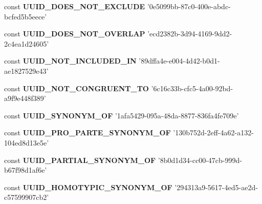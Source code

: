\begin{DoxyCompactItemize}
\item 
\hypertarget{uuids_8php_a5f3d242ba89004c96bb9a40ef73365de}{const {\bfseries U\-U\-I\-D\-\_\-\-D\-O\-E\-S\-\_\-\-N\-O\-T\-\_\-\-E\-X\-C\-L\-U\-D\-E} '0e5099bb-\/87c0-\/400e-\/abdc-\/bcfed5b5eece'}\label{uuids_8php_a5f3d242ba89004c96bb9a40ef73365de}

\item 
\hypertarget{uuids_8php_ae33e6c5b2d2ecb226e87b4058bbadbe6}{const {\bfseries U\-U\-I\-D\-\_\-\-D\-O\-E\-S\-\_\-\-N\-O\-T\-\_\-\-O\-V\-E\-R\-L\-A\-P} 'ecd2382b-\/3d94-\/4169-\/9dd2-\/2c4ea1d24605'}\label{uuids_8php_ae33e6c5b2d2ecb226e87b4058bbadbe6}

\item 
\hypertarget{uuids_8php_acbd4546a55e17960d98ae5435f4b151b}{const {\bfseries U\-U\-I\-D\-\_\-\-N\-O\-T\-\_\-\-I\-N\-C\-L\-U\-D\-E\-D\-\_\-\-I\-N} '89dffa4e-\/e004-\/4d42-\/b0d1-\/ae1827529e43'}\label{uuids_8php_acbd4546a55e17960d98ae5435f4b151b}

\item 
\hypertarget{uuids_8php_a677917e6555fb38572a85c72179e3e1f}{const {\bfseries U\-U\-I\-D\-\_\-\-N\-O\-T\-\_\-\-C\-O\-N\-G\-R\-U\-E\-N\-T\-\_\-\-T\-O} '6c16c33b-\/cfc5-\/4a00-\/92bd-\/a9f9e448f389'}\label{uuids_8php_a677917e6555fb38572a85c72179e3e1f}

\item 
\hypertarget{uuids_8php_a20dbe2288d3045cde6d7b402eb7f250a}{const {\bfseries U\-U\-I\-D\-\_\-\-S\-Y\-N\-O\-N\-Y\-M\-\_\-\-O\-F} '1afa5429-\/095a-\/48da-\/8877-\/836fa4fe709e'}\label{uuids_8php_a20dbe2288d3045cde6d7b402eb7f250a}

\item 
\hypertarget{uuids_8php_a62bdb95ccd548cc79f7d2b5dff510691}{const {\bfseries U\-U\-I\-D\-\_\-\-P\-R\-O\-\_\-\-P\-A\-R\-T\-E\-\_\-\-S\-Y\-N\-O\-N\-Y\-M\-\_\-\-O\-F} '130b752d-\/2eff-\/4a62-\/a132-\/104ed8d13e5e'}\label{uuids_8php_a62bdb95ccd548cc79f7d2b5dff510691}

\item 
\hypertarget{uuids_8php_a95094825ce6121fbe43cb5d039af5b31}{const {\bfseries U\-U\-I\-D\-\_\-\-P\-A\-R\-T\-I\-A\-L\-\_\-\-S\-Y\-N\-O\-N\-Y\-M\-\_\-\-O\-F} '8b0d1d34-\/cc00-\/47cb-\/999d-\/b67f98d1af6e'}\label{uuids_8php_a95094825ce6121fbe43cb5d039af5b31}

\item 
\hypertarget{uuids_8php_a0b37463c0256201ff8e3f696216c1798}{const {\bfseries U\-U\-I\-D\-\_\-\-H\-O\-M\-O\-T\-Y\-P\-I\-C\-\_\-\-S\-Y\-N\-O\-N\-Y\-M\-\_\-\-O\-F} '294313a9-\/5617-\/4ed5-\/ae2d-\/c57599907cb2'}\label{uuids_8php_a0b37463c0256201ff8e3f696216c1798}


\end{DoxyCompactItemize}
